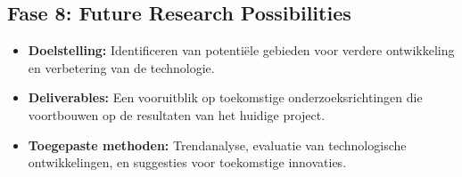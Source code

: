 \subsection{Fase 8: Future Research Possibilities}
\begin{itemize}
\item \textbf{Doelstelling:} Identificeren van potentiële gebieden voor verdere ontwikkeling en verbetering van de technologie.
\item \textbf{Deliverables:} Een vooruitblik op toekomstige onderzoeksrichtingen die voortbouwen op de resultaten van het huidige project.
\item \textbf{Toegepaste methoden:} Trendanalyse, evaluatie van technologische ontwikkelingen, en suggesties voor toekomstige innovaties.
\end{itemize}

